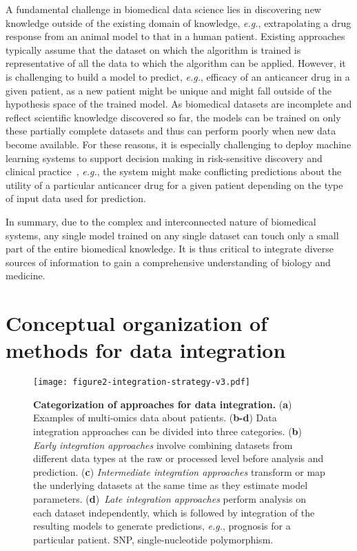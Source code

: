 \documentclass[5p]{elsarticle}
\newcommand{\eg}{\emph{e.g.}\xspace}
\newcommand{\rev}[1]{{\color{black}#1}}
\begin{document}
A fundamental challenge in biomedical data science lies in discovering new knowledge outside of the existing domain of know\-ledge, \eg, extrapolating a drug response from an animal model to that in a human patient.
Existing approaches typically assume that the dataset on which the algorithm is trained is representative of all the data to which the algorithm can be applied.
However, it is challenging to build a model to predict, \eg, efficacy of an anticancer drug in a given patient, as a new patient might be unique and might fall outside of the hypothesis space of the trained model.
\rev{A}s biomedical datasets are incomplete and reflect scientific knowledge discovered so far, the models can be trained on only these partially complete datasets and thus can perform poorly when new data become available.
For these reasons, it is especially challenging to deploy machine learning systems to support decision making in risk-sensitive discovery and clinical practice~\cite{Mullainathan2017does}, \eg, the system might make conflicting predictions about \rev{the} utility of a particular anticancer drug for a given patient depending on the type of input data used for prediction.

In summary, due to the complex and interconnected nature of biomedical systems, any single model trained on any single dataset can touch only a small part of the entire biomedical knowledge.
It is thus critical to integrate diverse sources of information to gain a comprehensive understanding of biology and medicine.


\section{Conceptual organization of methods for data integration}

\begin{figure}[t]
\centering
\texttt{[image: figure2-integration-strategy-v3.pdf]}
\caption{\textbf{Categorization of approaches for data integration.} (\textbf{a}) Examples of multi-omics data about patients. (\textbf{b-d}) Data integration approaches can be divided into three categories. (\textbf{b}) {\em Early integration approaches} involve combining datasets from different data types at the raw or processed level before analysis and prediction. (\textbf{c}) {\em Intermediate integration approaches} transform or map the underlying datasets at the same time as they estimate model parameters. (\textbf{d})~{\em Late integration approaches} perform analysis on each dataset independently, which is followed by integration of the resulting models to generate predictions, \eg, prognosis for a particular patient. SNP, single-nucleotide polymorphism.}
\label{fig:integration-strategy}
\end{figure}
\end{document}
